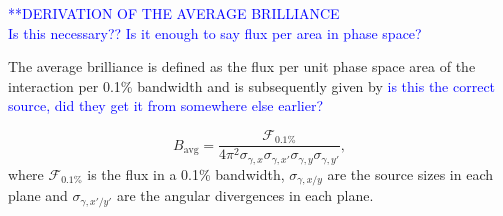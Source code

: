 \documentclass[../main.tex]{subfiles}
\begin{document}
\textcolor{blue}{**DERIVATION OF THE AVERAGE BRILLIANCE \\ Is this necessary?? Is it enough to say flux per area in phase space?}

The average brilliance is defined as the flux per unit phase space area of the interaction per 0.1\% bandwidth and is subsequently given by \cite{krafft2010compton,deitrick2018high} \textcolor{blue}{is this the correct source, did they get it from somewhere else earlier?}

\begin{equation}
B_{\mathrm{avg}} = \frac{\mathcal{F}_{0.1\%}}{4\pi^{2}\sigma_{\gamma,x}\sigma_{\gamma,x'}\sigma_{\gamma,y}\sigma_{\gamma,y'}},
\label{eq:average_brightness}
\end{equation}
where $\mathcal{F}_{0.1\%}$ is the flux in a 0.1\% bandwidth, $\sigma_{\gamma,x/y}$ are the source sizes in each plane and $\sigma_{\gamma,x'/y'}$ are the angular divergences in each plane.
\end{document}
